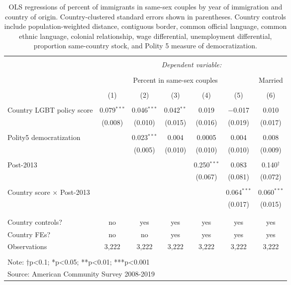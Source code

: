 \documentclass[
  11pt,
]{article}
\begin{document}
\begin{table}[!htbp] \centering 
  \caption{OLS regressions of percent of immigrants in same-sex couples by year of immigration and country of origin. Country-clustered standard errors shown in parentheses. Country controls include population-weighted distance, contiguous border, common official language, common ethnic language, colonial relationship, wage differential, unemployment differential, proportion same-country stock, and Polity 5 measure of democratization.} 
  \label{tab:country-props} 
\begin{tabular}{@{\extracolsep{5pt}}lcccccc} 
\\[-1.8ex]\hline 
\hline \\[-1.8ex] 
 & \multicolumn{6}{c}{\textit{Dependent variable:}} \\ 
\cline{2-7} 
\\[-1.8ex] & \multicolumn{5}{c}{Percent in same-sex couples} & Married \\ 
\\[-1.8ex] & (1) & (2) & (3) & (4) & (5) & (6)\\ 
\hline \\[-1.8ex] 
 Country LGBT policy score & 0.079$^{***}$ & 0.046$^{***}$ & 0.042$^{**}$ & 0.019 & $-$0.017 & 0.010 \\ 
  & (0.008) & (0.010) & (0.015) & (0.016) & (0.019) & (0.017) \\ 
  & & & & & & \\ 
 Polity5 democratization &  & 0.023$^{***}$ & 0.004 & 0.0005 & 0.004 & 0.008 \\ 
  &  & (0.005) & (0.010) & (0.010) & (0.010) & (0.009) \\ 
  & & & & & & \\ 
 Post-2013 &  &  &  & 0.250$^{***}$ & 0.083 & 0.140$^{†}$ \\ 
  &  &  &  & (0.067) & (0.081) & (0.072) \\ 
  & & & & & & \\ 
 Country score × Post-2013 &  &  &  &  & 0.064$^{***}$ & 0.060$^{***}$ \\ 
  &  &  &  &  & (0.017) & (0.015) \\ 
  & & & & & & \\ 
\hline \\[-1.8ex] 
Country controls? & no & yes & yes & yes & yes & yes \\ 
Country FEs? & no & no & yes & yes & yes & yes \\ 
Observations & 3,222 & 3,222 & 3,222 & 3,222 & 3,222 & 3,222 \\ 
\hline 
\hline \\[-1.8ex] 
\multicolumn{7}{l}{Note: †p<0.1; *p<0.05; **p<0.01; ***p<0.001} \\ 
\multicolumn{7}{l}{Source: American Community Survey 2008-2019} \\ 
\end{tabular} 
\end{table}
\end{document}
